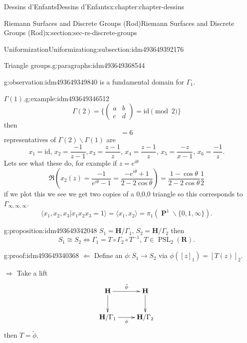 \documentclass[oneside,10pt,]{book}
\numberwithin{equation}{section}
\newcommand{\inv}{^{-1}}
\newcommand{\lb}{[}
\newcommand{\rb}{]}
\newcommand{\RR}{\mathbf{R}}
\newcommand{\HH}{\mathbf{H}}
\newcommand{\id}{\mathrm{id}}
\DeclareMathOperator{\PP}{\mathbf{P}}
\DeclareMathOperator{\PSL}{PSL}
\newcommand{\amp}{&}
\begin{document}
\begin{chapterptx}{Dessins d'Enfants}{}{Dessins d'Enfants}{}{}{x:chapter:chapter-dessins}
\begin{sectionptx}{Riemann Surfaces and Discrete Groups (Rod)}{}{Riemann Surfaces and Discrete Groups (Rod)}{}{}{x:section:sec-rs-discrete-groups}
\begin{subsectionptx}{Uniformization}{}{Uniformization}{}{}{g:subsection:idm493649392176}
\begin{paragraphs}{Triangle groups.}{g:paragraphs:idm493649368544}
\begin{observation}{}{g:observation:idm493649349840}
is a fundamental domain for \(\Gamma_1\).%
\end{observation}
\begin{example}{\(\Gamma(1)\).}{g:example:idm493649346512}%
%
\begin{equation*}
\Gamma(2) = \{\begin{pmatrix} a\amp b \\ c\amp d\end{pmatrix} = \id \pmod 2 \}
\end{equation*}
then%
\begin{equation*}
[\Gamma(1) : \Gamma(2)] = 6
\end{equation*}
representatives of \(\Gamma(2) \backslash \Gamma(1)\) are%
\begin{equation*}
x_1 = \id,\,x_2 = \frac{-1}{z-1}, x_3 = \frac{z-1}{z},\, x_4 = \frac{z-1}{z},\,x_5 = \frac{-z}{x-1},\,x_6 = \frac{-1}{z}\text{.}
\end{equation*}
Lets see what these do, for example if \(z= e^{i\theta}\)%
\begin{equation*}
\Re(x_2(z) = \frac{-1}{e^{i\theta} - 1} = \frac{-e^{i\theta} + 1}{2- 2\cos \theta}) = \frac{1-\cos \theta}{ 2- 2\cos \theta} \frac 12
\end{equation*}
if we plot this we see we get two copies of a 0,0,0 triangle so this corresponds to \(\Gamma_{\infty,\infty,\infty}\).%
\begin{equation*}
\langle x_1, x_2, x_3 | x_1x_2x_3 = 1\rangle = \langle x_1,x_2\rangle = \pi_1(\PP^1\smallsetminus\{0,1,\infty\})\text{.}
\end{equation*}
%
\end{example}
\begin{proposition}{}{}{g:proposition:idm493649342048}%
\(S_1 = \HH/ \Gamma_1\), \(S_2 = \HH/\Gamma_2\) then%
\begin{equation*}
S_1 \cong S_2 \iff \Gamma_1 = T\circ \Gamma_2 \circ T\inv,\,T\in \PSL_2(\RR)\text{.}
\end{equation*}
%
\end{proposition}
\begin{proofptx}{}{g:proof:idm493649340368}
\(\Leftarrow\) Define an \(\phi\colon S_1 \to S_2\) via \(\phi(\lb z\rb_1) = \lb T(z)\rb_2\).%
\par
\(\Rightarrow\) Take a lift%
\begin{equation*}
\xymatrix{
\HH\ar[r]^{\tilde\phi}\ar[d] & \HH\ar[d] \\
\HH/\Gamma_1\ar[r]_\phi & \HH/\Gamma_2
}
\end{equation*}
then \(T= \tilde \phi\).%

\end{proofptx}
\end{paragraphs}
\end{subsectionptx}
\end{sectionptx}
\end{chapterptx}
\end{document}
